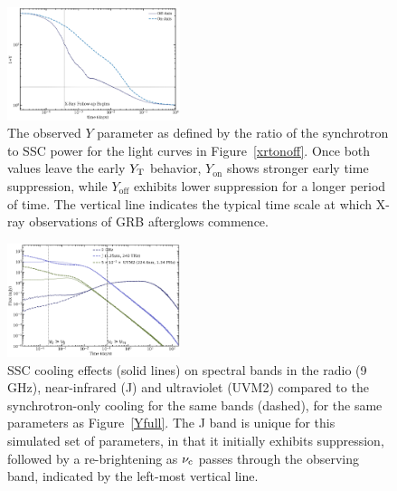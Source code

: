 \documentclass[fleqn,usenatbib]{mnras}
\begin{document}
\begin{figure}
    \includegraphics[width=0.45\textwidth]{images/Y-on-vs-off.png}
    \caption{The observed $Y$ parameter as defined by the ratio of the synchrotron to SSC power for the light curves in Figure~\ref{xrtonoff}. Once both values leave the early $Y_{\rm T}$ behavior, $Y_{\text{on}}$ shows stronger early time suppression, while $Y_\text{{off}}$ exhibits lower suppression for a longer period of time. The vertical line indicates the typical time scale at which X-ray observations of GRB afterglows commence.}
    \label{fig:y-off}
\end{figure}

\begin{figure}
    \includegraphics[width=0.45\textwidth]{images/bump_spec.png}
    \caption{SSC cooling effects (solid lines) on spectral bands in the radio (9 GHz), near-infrared (J) and ultraviolet (UVM2) compared to the synchrotron-only cooling for the same bands (dashed), for the same parameters as Figure~\ref{Yfull}. The J band is unique for this simulated set of parameters, in that it initially exhibits suppression, followed by a re-brightening as $\nu_{\rm c}$ passes through the observing band, indicated by the left-most vertical line.}
    \label{fig:bump-spec}
\end{figure}
\end{document}
